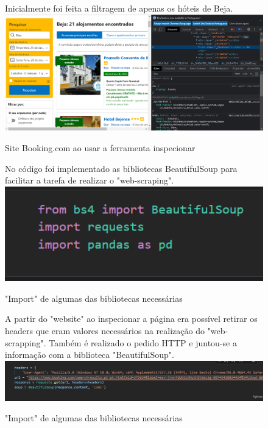 \documentclass[a4paper,10pt]{article}
\begin{document}
\begin{figure}[!htb]
Inicialmente foi feita a filtragem de apenas os hóteis de Beja.
    \centering
    \includegraphics[width=15cm]{1.PNG}
    \caption{Site Booking.com ao usar a ferramenta inspecionar}
    \label{fig:my_label}
\end{figure}

\begin{figure}[!htb]
No código foi implementado as bibliotecas BeautifulSoup para facilitar a tarefa de realizar o "web-scraping".
    \centering
    \includegraphics[width=15cm]{2.PNG}
    \caption{"Import" de algumas das bibliotecas necessárias}
    \label{fig:my_label}
\end{figure}

\begin{figure}[!htb]
A partir do "website" ao inspecionar a página era possível retirar os headers que eram valores necessários na realização do "web-scrapping". Também é realizado o pedido HTTP e juntou-se a informação com a biblioteca "BeautifulSoup".
    \centering
    \includegraphics[width=15cm]{3.PNG}
    \caption{"Import" de algumas das bibliotecas necessárias}
    \label{fig:my_label}
\end{figure}
\end{document}
